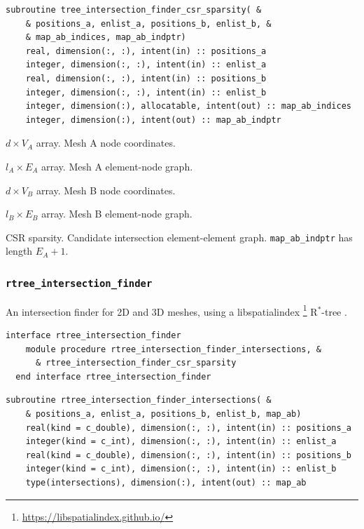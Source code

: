 \documentclass{article}
\begin{document}
\begin{lstlisting}[language=FORTRAN]
  subroutine tree_intersection_finder_csr_sparsity( &
    & positions_a, enlist_a, positions_b, enlist_b, &
    & map_ab_indices, map_ab_indptr)
    real, dimension(:, :), intent(in) :: positions_a
    integer, dimension(:, :), intent(in) :: enlist_a
    real, dimension(:, :), intent(in) :: positions_b
    integer, dimension(:, :), intent(in) :: enlist_b
    integer, dimension(:), allocatable, intent(out) :: map_ab_indices
    integer, dimension(:), intent(out) :: map_ab_indptr
\end{lstlisting}

\begin{description}[font=\ttfamily\bfseries,leftmargin=2.2\parindent,labelindent=1.7\parindent,noitemsep]
  \item[positions\_a] $d \times V_A$ array. Mesh A node coordinates.
  \item[enlist\_a] $l_A \times E_A$ array. Mesh A element-node graph.
  \item[positions\_b] $d \times V_B$ array. Mesh B node coordinates.
  \item[enlist\_b] $l_B \times E_B$ array. Mesh B element-node graph.
  \item[map\_ab\_indices, map\_ab\_indptr] CSR sparsity. Candidate intersection
    element-element graph. \linebreak \verb+map_ab_indptr+ has length $E_A + 1$.
\end{description}

\subsubsection{\texttt{rtree\_intersection\_finder}}\label{sect:rtree_global}

An intersection finder for 2D and 3D meshes, using a libspatialindex
\footnote{\url{https://libspatialindex.github.io/}} R${}^*$-tree
\citep{guttman1984,beckmann1990}.

\begin{lstlisting}[language=FORTRAN]
  interface rtree_intersection_finder
    module procedure rtree_intersection_finder_intersections, &
      & rtree_intersection_finder_csr_sparsity
  end interface rtree_intersection_finder
\end{lstlisting}

\begin{lstlisting}[language=FORTRAN]
  subroutine rtree_intersection_finder_intersections( &
    & positions_a, enlist_a, positions_b, enlist_b, map_ab)
    real(kind = c_double), dimension(:, :), intent(in) :: positions_a
    integer(kind = c_int), dimension(:, :), intent(in) :: enlist_a
    real(kind = c_double), dimension(:, :), intent(in) :: positions_b
    integer(kind = c_int), dimension(:, :), intent(in) :: enlist_b
    type(intersections), dimension(:), intent(out) :: map_ab
\end{lstlisting}
\end{document}
